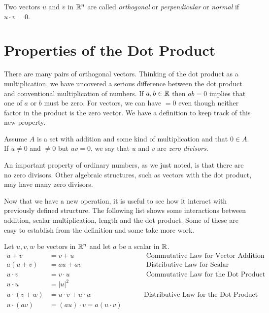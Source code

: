 \documentclass[fleqn]{report}
\begin{document}
\begin{defn}
Two vectors $u$ and $v$ in $\mathbb{R}^n$ are called \emph{orthogonal}
or \emph{perpendicular} or \emph{normal} if $u \cdot v = 0$. 
\end{defn}

\section{Properties of the Dot Product}

There are many pairs of orthogonal vectors. Thinking of the
dot product as a multiplication, we have uncovered a serious
difference between the dot product and conventional
multiplication of numbers. If $a,b\in \mathbb{R}$ then $ab=0$
implies that one of $a$ or $b$ must be zero. For vectors, we
can have  $= 0$ even though neither factor in the
product is the zero vector. We have a definition to keep
track of this new property.

\begin{defn}
Assume $A$ is a set with addition and some kind of
multiplication and that $0 \in A$. If $u \neq 0$ and $\neq 0$
but $uv =0$, we say that $u$ and $v$ are \emph{zero divisors}.
\end{defn}

An important property of ordinary numbers, as we just noted,
is that there are no zero divisors. Other algebraic
structures, such as vectors with the dot product, may have
many zero divisors.

Now that we have a new operation, it is useful to see how it
interact with previously defined structure. The following list shows
some interactions between addition, scalar multiplication,
length and the dot product. Some of these are easy to
establish from the definition and some take more work.

\begin{prop}
Let $u,v,w$ be vectors in $\mathbb{R}^n$ and let $a$ be a scalar in $\mathbb{R}$.
\begin{displaymath}
\begin{array}{rll}
u + v & = v + u & \hspace{1cm} \text{ Commutative Law for
Vector Addition} \\
a (u+v) & = au + av & \hspace{1cm} \text{ Distributive Law for
Scalar Multiplication}\\
u \cdot v & = v \cdot u & \hspace{1cm} \text{ Commutative
Law for the Dot Product}\\
u \cdot u & = |u|^2 & \\
u \cdot (v+w) & = u \cdot v + u \cdot w & \hspace{1cm} \text{
Distributive Law for the Dot Product}\\
u \cdot (av) & = (au) \cdot v = a (u \cdot v) 
\end{array}
\end{displaymath}
\end{prop}
\end{document}
